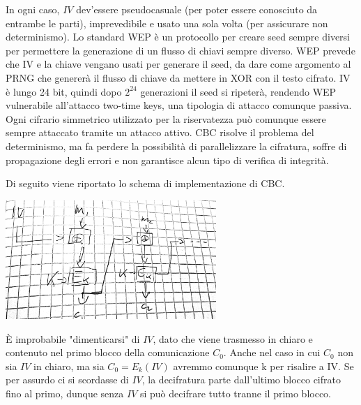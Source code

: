 \documentclass[answers, a4paper, 11pt]{exam}
\begin{document}
\begin{questions}
\begin{parts}
\begin{solution}
\begin{itemize}
In ogni caso, $IV$ dev'essere pseudocasuale (per poter essere conosciuto da entrambe le parti), imprevedibile e usato una sola volta (per assicurare non determinismo).
Lo standard WEP è un protocollo per creare seed sempre diversi per permettere la generazione di un flusso di chiavi sempre diverso.
WEP prevede che IV e la chiave vengano usati per generare il seed, da dare come argomento al PRNG che genererà il flusso di chiave da mettere in XOR con il testo cifrato.
	IV è lungo 24 bit, quindi dopo $2^{24}$ generazioni il seed si ripeterà, rendendo WEP vulnerabile all'attacco two-time keys, una tipologia di attacco comunque passiva.
	Ogni cifrario simmetrico utilizzato per la riservatezza può comunque essere sempre attaccato tramite un attacco attivo.
	CBC risolve il problema del determinismo, ma fa perdere la possibilità di parallelizzare la cifratura, soffre di propagazione degli errori e non garantisce alcun tipo di verifica di integrità.
	\end{itemize}

Di seguito viene riportato lo schema di implementazione di CBC.

\includegraphics[width=0.6\textwidth]{cbc}

	È improbabile "dimenticarsi" di $IV$, dato che viene trasmesso in chiaro e contenuto nel primo blocco della comunicazione $C_0$.
	Anche nel caso in cui $C_0$ non sia $IV$ in chiaro, ma sia $C_0 = E_k(IV)$ avremmo comunque k per risalire a IV.
	Se per assurdo ci si scordasse di $IV$, la decifratura parte dall’ultimo blocco cifrato fino al primo, dunque senza $IV$ si può decifrare tutto tranne il primo blocco.
\end{solution}

\end{parts}
\end{questions}
\end{document}

